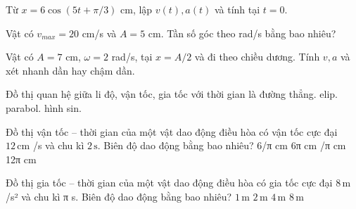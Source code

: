 \begin{ex}
Từ $x=6\cos(5t+\pi/3)$ cm, lập $v(t),a(t)$ và tính tại $t=0$.
\choiceTF

\end{ex}

\begin{ex}
Vật có $v_{max}=20$ cm/s và $A=5$ cm. Tần số góc theo rad/s bằng bao nhiêu?
\end{ex}

\begin{ex}
Vật có $A=7$ cm, $\omega=2$ rad/s, tại $x=A/2$ và đi theo chiều dương. Tính $v,a$ và xét nhanh dần hay chậm dần.
\choiceTF

\end{ex}

\begin{ex}
Đồ thị quan hệ giữa li độ, vận tốc, gia tốc với thời gian là đường
\choice
{thẳng.}
{elip.}
{parabol.}
{\True hình sin.}
\end{ex}

\begin{ex}
Đồ thị vận tốc – thời gian của một vật dao động điều hòa có vận tốc cực đại $12\,\text{cm}$ /s và chu kì $2\,\text{s}$. Biên độ dao động bằng bao nhiêu?
\choice
{6/π cm}
{6π cm}
{/π cm}
{12π cm}
\end{ex}

\begin{ex}
Đồ thị gia tốc – thời gian của một vật dao động điều hòa có gia tốc cực đại $8\,\text{m}$ /s² và chu kì π s. Biên độ dao động bằng bao nhiêu?
\choice
{$1\,\text{m}$}
{\True $2\,\text{m}$}
{$4\,\text{m}$}
{$8\,\text{m}$}
\end{ex}
